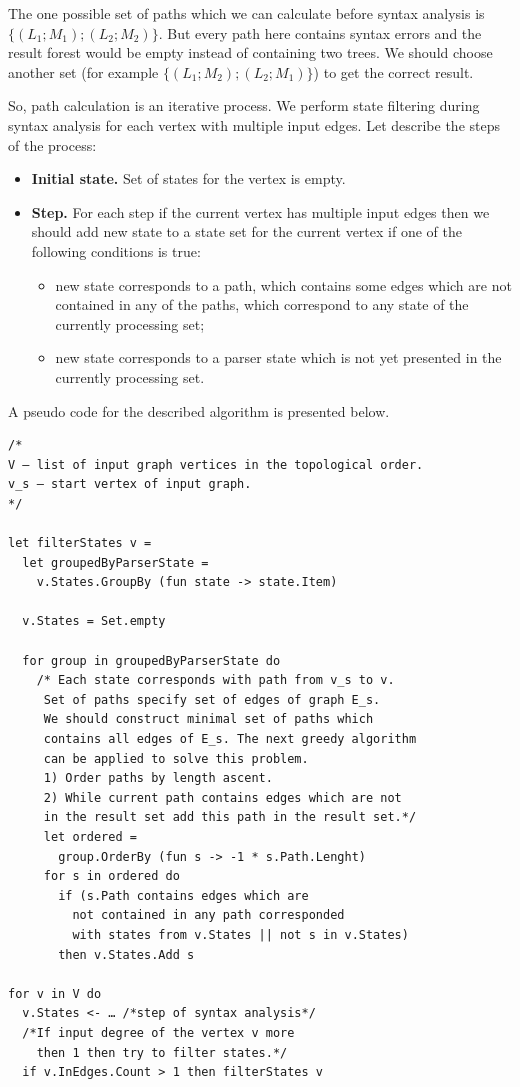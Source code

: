 The one possible set of paths which we can calculate before syntax analysis is $\{(L_1; M_1); (L_2; M_2)\}$. 
But every path here contains syntax errors and the result forest would be empty instead of containing 
two trees. We should choose another set (for example $\{(L_1; M_2); (L_2; M_1)\}$) to get the correct result. 

So, path calculation is an iterative process. We perform state filtering during syntax analysis for each vertex 
with multiple input edges. Let describe the steps of the process:

\begin{itemize}
    \item \textbf{Initial state.} Set of states for the vertex is empty. 
    \item \textbf{Step.} For each step if the current vertex has multiple input edges then we should add new 
                 state to a state set for the current vertex if one of the following conditions is true:
    \begin{itemize}
        \item new state corresponds to a path, which contains some edges which are not contained in any of the paths, which correspond to any state of the currently processing set;
        \item new state corresponds to a parser state which is not yet presented in the currently processing set.
    \end{itemize}

\end{itemize}

A pseudo code for the described algorithm is presented below.
\scriptsize
\begin{verbatim}
/*
V – list of input graph vertices in the topological order.
v_s – start vertex of input graph.
*/

let filterStates v =
  let groupedByParserState =
    v.States.GroupBy (fun state -> state.Item)

  v.States = Set.empty

  for group in groupedByParserState do
    /* Each state corresponds with path from v_s to v.
     Set of paths specify set of edges of graph E_s.
     We should construct minimal set of paths which
     contains all edges of E_s. The next greedy algorithm
     can be applied to solve this problem.
     1) Order paths by length ascent.
     2) While current path contains edges which are not
     in the result set add this path in the result set.*/
     let ordered = 
       group.OrderBy (fun s -> -1 * s.Path.Lenght)
     for s in ordered do
       if (s.Path contains edges which are 
         not contained in any path corresponded
         with states from v.States || not s in v.States) 
       then v.States.Add s

for v in V do
  v.States <- … /*step of syntax analysis*/
  /*If input degree of the vertex v more 
    then 1 then try to filter states.*/
  if v.InEdges.Count > 1 then filterStates v

\end{verbatim}
\normalsize

